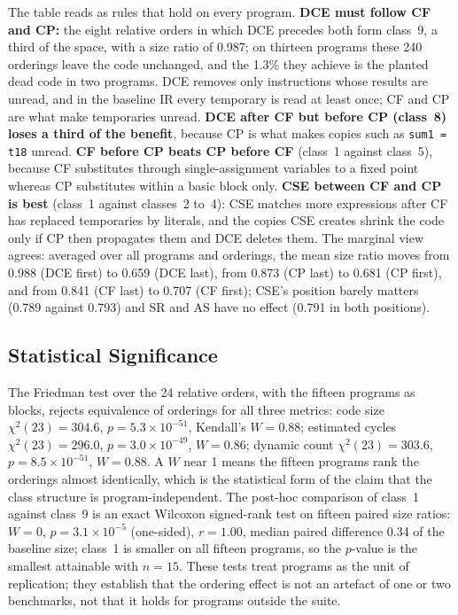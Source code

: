 \documentclass[conference]{IEEEtran}
\begin{document}
The table reads as rules that hold on every program. \textbf{DCE must follow CF and CP:} the eight relative orders in which DCE precedes both form class~9, a third of the space, with a size ratio of 0.987; on thirteen programs these 240 orderings leave the code unchanged, and the 1.3\% they achieve is the planted dead code in two programs. DCE removes only instructions whose results are unread, and in the baseline IR every temporary is read at least once; CF and CP are what make temporaries unread. \textbf{DCE after CF but before CP (class~8) loses a third of the benefit}, because CP is what makes copies such as \texttt{sum1 = t18} unread. \textbf{CF before CP beats CP before CF} (class~1 against class~5), because CF substitutes through single-assignment variables to a fixed point whereas CP substitutes within a basic block only. \textbf{CSE between CF and CP is best} (class~1 against classes~2 to~4): CSE matches more expressions after CF has replaced temporaries by literals, and the copies CSE creates shrink the code only if CP then propagates them and DCE deletes them. The marginal view agrees: averaged over all programs and orderings, the mean size ratio moves from 0.988 (DCE first) to 0.659 (DCE last), from 0.873 (CP last) to 0.681 (CP first), and from 0.841 (CF last) to 0.707 (CF first); CSE's position barely matters (0.789 against 0.793) and SR and AS have no effect (0.791 in both positions).

\subsection{Statistical Significance}
\label{sec:stats}
The Friedman test over the 24 relative orders, with the fifteen programs as blocks, rejects equivalence of orderings for all three metrics: code size $\chi^2(23) = 304.6$, $p = 5.3 \times 10^{-51}$, Kendall's $W = 0.88$; estimated cycles $\chi^2(23) = 296.0$, $p = 3.0 \times 10^{-49}$, $W = 0.86$; dynamic count $\chi^2(23) = 303.6$, $p = 8.5 \times 10^{-51}$, $W = 0.88$. A $W$ near 1 means the fifteen programs rank the orderings almost identically, which is the statistical form of the claim that the class structure is program-independent. The post-hoc comparison of class~1 against class~9 is an exact Wilcoxon signed-rank test on fifteen paired size ratios: $W = 0$, $p = 3.1 \times 10^{-5}$ (one-sided), $r = 1.00$, median paired difference 0.34 of the baseline size; class~1 is smaller on all fifteen programs, so the $p$-value is the smallest attainable with $n = 15$. These tests treat programs as the unit of replication; they establish that the ordering effect is not an artefact of one or two benchmarks, not that it holds for programs outside the suite.
\end{document}
